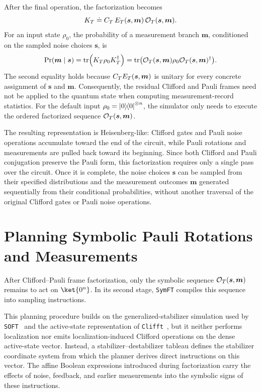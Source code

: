 \documentclass[a4paper,onecolumn,unpublished]{quantumarticle}
\DeclarePairedDelimiter\rbra{\lparen}{\rparen}
\newcommand{\ketbra}[3][]{\left\lvert #2 \vphantom{#3} \right>_{#1}\!\!\left< #3 \vphantom{#2} \right\rvert}
\DeclareMathOperator{\tr}{tr}
\newcommand{\tFont}[1]{\texttt{#1}}
\newcommand{\symft}{\tFont{SymFT}}
\newcommand{\soft}{\tFont{SOFT}}
\newcommand{\clifft}{\tFont{Clifft}}
\newcommand{\cO}{\mathcal{O}}
\begin{document}
After the final operation, the factorization becomes
\begin{equation}\label{eq:factorized-circuit}
    K_T \doteq C_T\, E_T\rbra{\bm{s},\bm{m}}\, \cO_T\rbra{\bm{s},\bm{m}}.
\end{equation}
For an input state $\rho_0$, the probability of a measurement branch $\bm{m}$, conditioned on the sampled noise choices $\bm{s}$, is
\begin{equation}\label{eq:factorized-branch-probability}
    \Pr\rbra*{\bm{m} \mid \bm{s}} = \tr\rbra*{K_T \rho_0 K_T^\dagger} = \tr\rbra*{\cO_T\rbra{\bm{s},\bm{m}} \rho_0 \cO_T\rbra{\bm{s},\bm{m}}^{\dagger}}.
\end{equation}
The second equality holds because $C_TE_T\rbra{\bm{s},\bm{m}}$ is unitary for every concrete assignment of $\bm{s}$ and $\bm{m}$.
Consequently, the residual Clifford and Pauli frames need not be applied to the quantum state when computing measurement-record statistics.
For the default input
$\rho_0=\ketbra{0}{0}^{\otimes n}$, the simulator only needs to execute the ordered factorized sequence
$\cO_T\rbra{\bm{s},\bm{m}}$.

The resulting representation is Heisenberg-like: Clifford gates and Pauli noise operations accumulate toward the end of the circuit, while Pauli rotations and measurements are pulled back toward its beginning.
Since both Clifford and Pauli conjugation preserve the Pauli form, this factorization requires only a single pass over the circuit.
Once it is complete, the noise choices $\bm{s}$ can be sampled from their specified distributions and the measurement outcomes $\bm{m}$ generated sequentially from their conditional probabilities, without another traversal of the original Clifford gates or Pauli noise operations.


\section{Planning Symbolic Pauli Rotations and Measurements}
\label{sec:planning}

After Clifford--Pauli frame factorization, only the symbolic sequence $\cO_T\rbra{\bm{s},\bm{m}}$ remains to act on $\ket{0^n}$.
In its second stage, \symft{} compiles this sequence into sampling instructions.

This planning procedure builds on the generalized-stabilizer simulation used by \soft{}~\cite{LZZ+25} and the active-state representation of \clifft{}~\cite{CL26}, but it neither performs localization nor emits localization-induced Clifford operations on the dense active-state vector.
Instead, a stabilizer--destabilizer tableau defines the stabilizer coordinate system from which the planner derives direct instructions on this vector.
The affine Boolean expressions introduced during factorization carry the effects of noise, feedback, and earlier measurements into the symbolic signs of these instructions.
\end{document}
